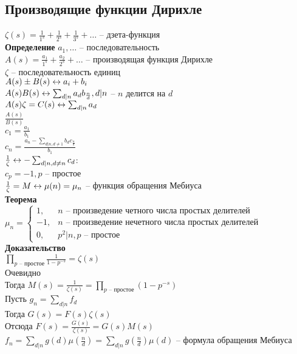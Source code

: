 \documentclass[12pt]{article}
\begin{document}
\subsection{Производящие функции Дирихле}
$\zeta(s) = \frac1{1^s} + \frac1{2^s} + \frac1{3^s} + \ldots$ -- дзета-функция\\
\textbf{Определение}
$a_1, \ldots$ -- последовательность\\
$A(s) = \frac{a_1}{1^s} + \frac{a_2}{2^s} + \ldots$ -- производящая функция Дирихле\\
$\zeta$ -- последовательность единиц\\
$A(s) \pm B(s) \leftrightarrow a_i + b_i$\\
$A(s)B(s) \leftrightarrow \sum_{d|n} a_d b_{\frac nd}, d|n$ -- $n$ делится на $d$\\
$A(s)\zeta = C(s) \leftrightarrow \sum_{d|n} a_d$\\
$\frac{A(s)}{B(s)}$\\
$c_1 = \frac{a_1}{b_1}$\\
$c_n = \frac{a_n - \sum_{d|n, d \neq 1} b_dc_{\frac nd}}{b_1}$\\
$\frac{1}{\zeta} \leftrightarrow -\sum_{d|n, d\neq n} c_d$:\\
$c_p = -1, p$ -- простое\\
$\frac{1}{\zeta} = M \leftrightarrow \mu(n) = \mu_n$ -- функция обращения Мебиуса\\
\textbf{Теорема}\\
$\mu_n = \left\{\begin{array}{ll}
    1,&n \text{ -- произведение четного числа простых делителей}\\
    -1, &n \text{ -- произведение нечетного числа простых делителей}\\
    0,& p^2 | n, p\text{ -- простое}
\end{array}\right.$\\
\textbf{Доказательство}\\
$\prod_{p\text{ -- простое}} \frac1{1-p^{-s}} = \zeta(s)$\\
Очевидно\\
Тогда $M(s) = \frac{1}{\zeta(s)} = \prod_{p\text{ -- простое}} (1-p^{-s})$\\
Пусть $g_n = \sum_{d|n} f_d$\\
Тогда $G(s) = F(s) \zeta(s)$\\
Отсюда $F(s) = \frac{G(s)}{\zeta(s)} = G(s)M(s)$\\
$f_n = \sum_{d|n} g(d)\mu(\frac nd) = \sum_{d|n} g(\frac nd)\mu(d)$ -- формула обращения Мебиуса\\\\
\end{document}
